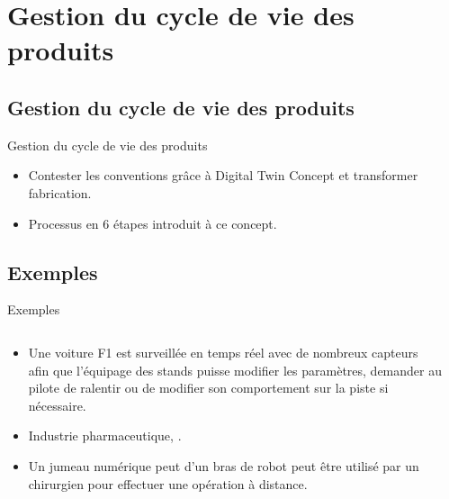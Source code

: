 \documentclass{beamer}
\begin{document}
\section{Gestion du cycle de vie des produits}

\subsection{Gestion du cycle de vie des produits}

\begin{frame}{Gestion du cycle de vie des produits}

\begin{itemize}
	\item Contester les conventions grâce à Digital Twin Concept et transformer fabrication.
	\item Processus en 6 étapes introduit à ce concept. 
\end{itemize}



\end{frame}
\subsection{Exemples}

\begin{frame}{Exemples}

\begin{columns}[T] %
\begin{column}{.38\textwidth}
\begin{itemize}
   \item Une voiture F1 est surveillée en temps réel avec de nombreux capteurs afin que l’équipage des stands puisse modifier les paramètres, demander au pilote de ralentir ou de modifier son comportement sur la piste si nécessaire.
   \item Industrie pharmaceutique, .
   \item Un jumeau numérique peut d'un bras de robot peut être utilisé par un chirurgien pour effectuer une opération à distance.
 \end{itemize}
\end{column}%
\hfill%
\begin{column}{.48\textwidth}
\end{column}%
\end{columns}
\end{frame}
\end{document}
